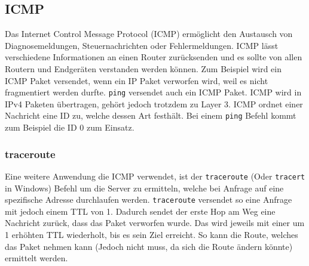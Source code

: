 \documentclass{article}
\begin{document}
	 \subsection{ICMP}
	 Das Internet Control Message Protocol (ICMP) ermöglicht den Austausch von Diagnosemeldungen, Steuernachrichten oder Fehlermeldungen. ICMP lässt verschiedene Informationen an einen Router zurücksenden und es sollte von allen Routern und Endgeräten verstanden werden können. Zum Beispiel wird ein ICMP Paket versendet, wenn ein IP Paket verworfen wird, weil es nicht fragmentiert werden durfte. \verb|ping| versendet auch ein ICMP Paket. ICMP wird in IPv4 Paketen übertragen, gehört jedoch trotzdem zu Layer 3. ICMP ordnet einer Nachricht eine ID zu, welche dessen Art festhält. Bei einem \verb|ping| Befehl kommt zum Beispiel die ID 0 zum Einsatz. \\
	 \subsubsection{traceroute}
	 Eine weitere Anwendung die ICMP verwendet, ist der \verb|traceroute| (Oder \verb|tracert| in Windows) Befehl um die Server zu ermitteln, welche bei Anfrage auf eine spezifische Adresse durchlaufen werden. \verb|traceroute| versendet so eine Anfrage mit jedoch einem TTL von 1. Dadurch sendet der erste Hop am Weg eine Nachricht zurück, dass das Paket verworfen wurde. Das wird jeweils mit einer um 1 erhöhten TTL wiederholt, bis es sein Ziel erreicht. So kann die Route, welches das Paket nehmen kann (Jedoch nicht muss, da sich die Route ändern könnte) ermittelt werden. \\
\end{document}
